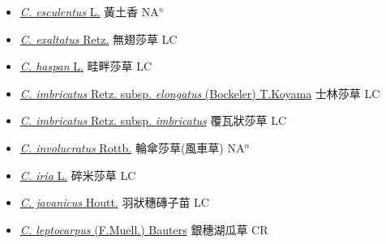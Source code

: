 \begin{itemize}
\begin{itemize}
        \item[] \href{http://www.theplantlist.org/tpl1.1/search?q=Cyperus+esculentus}{\textit{C. esculentus} L.}   黃土香 NA$^n$
        \item[] \href{http://www.theplantlist.org/tpl1.1/search?q=Cyperus+exaltatus}{\textit{C. exaltatus} Retz.}   無翅莎草 LC
        \item[] \href{http://www.theplantlist.org/tpl1.1/search?q=Cyperus+haspan}{\textit{C. haspan} L.}   畦畔莎草 LC
        \item[] \href{http://www.theplantlist.org/tpl1.1/search?q=Cyperus+imbricatus+subsp.+elongatus}{\textit{C. imbricatus} Retz. subsp. \textit{elongatus} (Bockeler) T.Koyama}   士林莎草 LC
        \item[] \href{http://www.theplantlist.org/tpl1.1/search?q=Cyperus+imbricatus+subsp.+imbricatus}{\textit{C. imbricatus} Retz. subsp. \textit{imbricatus}}   覆瓦狀莎草 LC
        \item[] \href{http://www.theplantlist.org/tpl1.1/search?q=Cyperus+involucratus}{\textit{C. involucratus} Rottb.}     輪傘莎草(風車草)   NA$^n$
        \item[] \href{http://www.theplantlist.org/tpl1.1/search?q=Cyperus+iria}{\textit{C. iria} L.}   碎米莎草 LC
        \item[] \href{http://www.theplantlist.org/tpl1.1/search?q=Cyperus+javanicus}{\textit{C. javanicus} Houtt.}     羽狀穗磚子苗 LC
        \item[] \href{http://www.theplantlist.org/tpl1.1/search?q=Cyperus+leptocarpus}{\textit{C. leptocarpus} (F.Muell.) Bauters}     銀穗湖瓜草 CR

\end{itemize}
\end{itemize}
